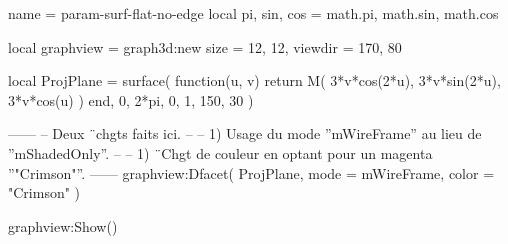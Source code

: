 \documentclass{standalone}
\begin{document}
\begin{luadraw}{name = param-surf-flat-no-edge}
local pi, sin, cos = math.pi, math.sin, math.cos

local graphview = graph3d:new{
  size    = {12, 12},
  viewdir = {170, 80}
}

local ProjPlane =  surface(
  function(u, v)
    return M(
      3*v*cos(2*u),
      3*v*sin(2*u),
      3*v*cos(u)
    )
  end,
  0, 2*pi, 0, 1,
  {150, 30}
)

------
-- Deux ¨chgts faits ici.
--
--     1) Usage du mode ''mWireFrame'' au lieu de ''mShadedOnly''.
--
--     1) ¨Chgt de couleur en optant pour un magenta ''"Crimson"''.
------
graphview:Dfacet(
  ProjPlane,
  {
    mode  = mWireFrame,
    color = "Crimson"
  }
)

graphview:Show()
\end{luadraw}
\end{document}
